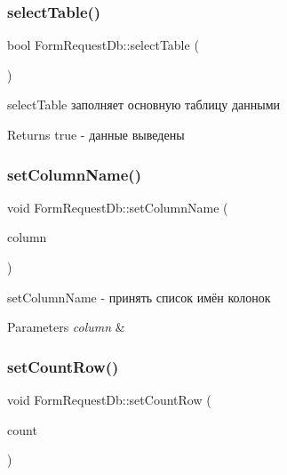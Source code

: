 \subsubsection{\texorpdfstring{select\+Table()}{selectTable()}}
{\footnotesize\ttfamily bool Form\+Request\+Db\+::select\+Table (\begin{DoxyParamCaption}{ }\end{DoxyParamCaption})}



select\+Table заполняет основную таблицу данными 

\begin{DoxyReturn}{Returns}
true -\/ данные выведены 
\end{DoxyReturn}
\mbox{\label{classFormRequestDb_a383d0f163ad200d2438e1549df626c4e}} 
\subsubsection{\texorpdfstring{set\+Column\+Name()}{setColumnName()}}
{\footnotesize\ttfamily void Form\+Request\+Db\+::set\+Column\+Name (\begin{DoxyParamCaption}\item[{const Q\+String\+List \&}]{column }\end{DoxyParamCaption})}



set\+Column\+Name -\/ принять список имён колонок 


\begin{DoxyParams}{Parameters}
{\em column} & \\
\hline
\end{DoxyParams}
\mbox{\label{classFormRequestDb_ae6ec41ba642b5b9351d5d5077ffb97e5}} 
\subsubsection{\texorpdfstring{set\+Count\+Row()}{setCountRow()}}
{\footnotesize\ttfamily void Form\+Request\+Db\+::set\+Count\+Row (\begin{DoxyParamCaption}\item[{const unsigned int}]{count }\end{DoxyParamCaption})}



